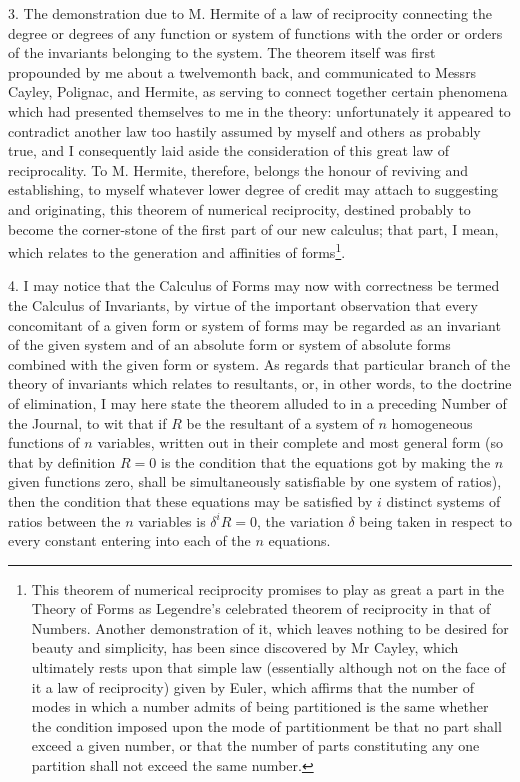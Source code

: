 \documentclass[11pt]{article}
\newcommand{\sourcepage}[1]{\marginpar{\scriptsize p.~#1}}
\begin{document}
{{\sourcepage{403}
3. The demonstration due to M. Hermite of a law of reciprocity connecting the degree or degrees of any function or system of functions with the order or orders of the invariants belonging to the system. The theorem itself was first propounded by me about a twelvemonth back, and communicated to Messrs Cayley, Polignac, and Hermite, as serving to connect together certain phenomena which had presented themselves to me in the theory: unfortunately it appeared to contradict another law too hastily assumed by myself and others as probably true, and I consequently laid aside the consideration of this great law of reciprocality. To M. Hermite, therefore, belongs the honour of reviving and establishing, to myself whatever lower degree of credit may attach to suggesting and originating, this theorem of numerical reciprocity, destined probably to become the corner-stone of the first part of our new calculus; that part, I mean, which relates to the generation and affinities of forms\footnote{This theorem of numerical reciprocity promises to play as great a part in the Theory of Forms as Legendre's celebrated theorem of reciprocity in that of Numbers. Another demonstration of it, which leaves nothing to be desired for beauty and simplicity, has been since discovered by Mr Cayley, which ultimately rests upon that simple law (essentially although not on the face of it a law of reciprocity) given by Euler, which affirms that the number of modes in which a number admits of being partitioned is the same whether the condition imposed upon the mode of partitionment be that no part shall exceed a given number, or that the number of parts constituting any one partition shall not exceed the same number.}.

4. I may notice that the Calculus of Forms may now with correctness be termed the Calculus of Invariants, by virtue of the important observation that every concomitant of a given form or system of forms may be regarded as an invariant of the given system and of an absolute form or system of absolute forms combined with the given form or system. As regards that particular branch of the theory of invariants which relates to resultants, or, in other words, to the doctrine of elimination, I may here state the theorem alluded to in a preceding Number of the Journal, to wit that if $R$ be the resultant of a system of $n$ homogeneous functions of $n$ variables, written out in their complete and most general form (so that by definition $R=0$ is the condition that the equations got by making the $n$ given functions zero, shall be simultaneously satisfiable by one system of ratios), then the condition that these equations may be satisfied by $i$ distinct systems of ratios between the $n$ variables is $\delta^i R=0$, the variation $\delta$ being taken in respect to every constant entering into each of the $n$ equations.

}}
\end{document}
